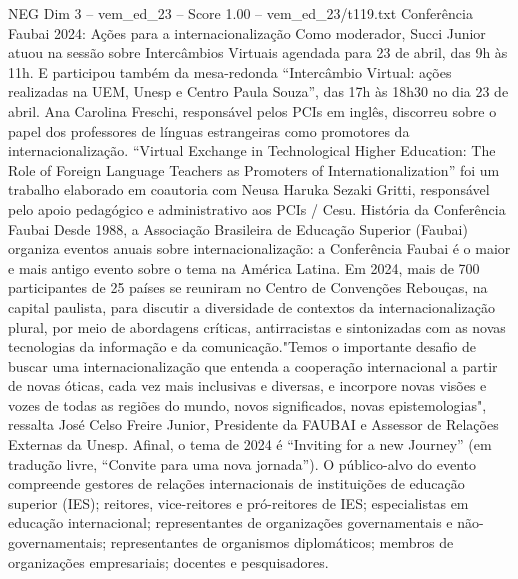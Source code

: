 \begin{textsample}{NEG Dim 3 – vem\_ed\_23 – Score 1.00 – vem\_ed\_23/t119.txt}  \label{ex:f3_neg_067}
Conferência Faubai 2024: Ações para a internacionalização Como moderador, Succi Junior atuou na sessão sobre Intercâmbios Virtuais agendada para 23 de abril, das 9h às 11h.
E participou também da mesa-redonda “Intercâmbio Virtual: ações realizadas na UEM, Unesp e Centro Paula Souza”, das 17h às 18h30 no dia 23 de abril.
Ana Carolina Freschi, responsável pelos PCIs em inglês, discorreu sobre o papel dos professores de línguas estrangeiras como promotores da internacionalização. “Virtual Exchange in Technological Higher Education: The Role of Foreign Language Teachers as Promoters of Internationalization” foi um trabalho elaborado em coautoria com Neusa Haruka Sezaki Gritti, responsável pelo apoio pedagógico e administrativo aos PCIs / Cesu.
História da Conferência Faubai Desde 1988, a Associação Brasileira de Educação Superior (Faubai) organiza eventos anuais sobre internacionalização: a Conferência Faubai é o maior e mais antigo evento sobre o tema na América Latina.
Em 2024, mais de 700 participantes de 25 países se reuniram no Centro de Convenções Rebouças, na capital paulista, para discutir a diversidade de contextos da internacionalização plural, por meio de abordagens críticas, antirracistas e sintonizadas com as novas tecnologias da informação e da comunicação."Temos o importante desafio de buscar uma internacionalização que entenda a cooperação internacional a partir de novas óticas, cada vez mais inclusivas e diversas, e incorpore novas visões e vozes de todas as regiões do mundo, novos significados, novas epistemologias", ressalta José Celso Freire Junior, Presidente da FAUBAI e Assessor de Relações Externas da Unesp.
Afinal, o tema de 2024 é “Inviting for a new Journey” (em tradução livre, “Convite para uma nova jornada”).
O público-alvo do evento compreende gestores de relações internacionais de instituições de educação superior (IES); reitores, vice-reitores e pró-reitores de IES; especialistas em educação internacional; representantes de organizações governamentais e não-governamentais; representantes de organismos diplomáticos; membros de organizações empresariais; docentes e pesquisadores.

\end{textsample}
